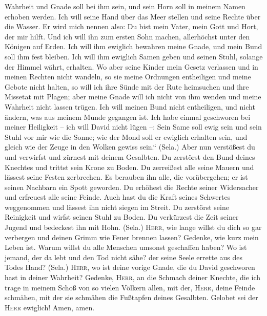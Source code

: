 Wahrheit und Gnade soll bei ihm sein, und sein Horn soll in meinem Namen
erhoben werden.  Ich will seine Hand über das Meer
stellen und seine Rechte über die Wasser.  Er wird mich
nennen also: Du bist mein Vater, mein Gott und Hort, der mir hilft.
 Und ich will ihn zum ersten Sohn machen, allerhöchst
unter den Königen auf Erden.  Ich will ihm ewiglich
bewahren meine Gnade, und mein Bund soll ihm fest bleiben.
 Ich will ihm ewiglich Samen geben und seinen Stuhl,
solange der Himmel währt, erhalten.  Wo aber seine Kinder
mein Gesetz verlassen und in meinen Rechten nicht wandeln,
 so sie meine Ordnungen entheiligen und meine Gebote
nicht halten,  so will ich ihre Sünde mit der Rute
heimsuchen und ihre Missetat mit Plagen;  aber meine
Gnade will ich nicht von ihm wenden und meine Wahrheit nicht lassen
trügen.  Ich will meinen Bund nicht entheiligen, und
nicht ändern, was aus meinem Munde gegangen ist.  Ich
habe einmal geschworen bei meiner Heiligkeit -- ich will David nicht
lügen --:  Sein Same soll ewig sein und sein Stuhl vor
mir wie die Sonne;  wie der Mond soll er ewiglich
erhalten sein, und gleich wie der Zeuge in den Wolken gewiss sein.``
(Sela.)  Aber nun verstößest du und verwirfst und zürnest
mit deinem Gesalbten.  Du zerstörst den Bund deines
Knechtes und trittst sein Krone zu Boden.  Du zerreißest
alle seine Mauern und lässest seine Festen zerbrechen. 
Es berauben ihn alle, die vorübergehen; er ist seinen Nachbarn ein Spott
geworden.  Du erhöhest die Rechte seiner Widersacher und
erfreuest alle seine Feinde.  Auch hast du die Kraft
seines Schwertes weggenommen und lässest ihn nicht siegen im Streit.
 Du zerstörst seine Reinigkeit und wirfst seinen Stuhl zu
Boden.  Du verkürzest die Zeit seiner Jugend und
bedeckest ihn mit Hohn. (Sela.)  \textsc{Herr}, wie lange
willst du dich so gar verbergen und deinen Grimm wie Feuer brennen
lassen?  Gedenke, wie kurz mein Leben ist. Warum willst
du alle Menschen umsonst geschaffen haben?  Wo ist
jemand, der da lebt und den Tod nicht sähe? der seine Seele errette aus
des Todes Hand? (Sela.)  \textsc{Herr}, wo ist deine
vorige Gnade, die du David geschworen hast in deiner Wahrheit?
 Gedenke, \textsc{Herr}, an die Schmach deiner Knechte,
die ich trage in meinem Schoß von so vielen Völkern allen,
 mit der, \textsc{Herr}, deine Feinde schmähen, mit der
sie schmähen die Fußtapfen deines Gesalbten.  Gelobet sei
der \textsc{Herr} ewiglich! Amen, amen.

